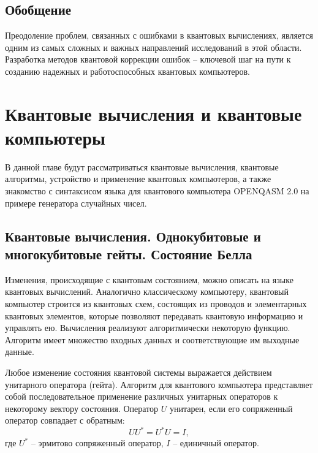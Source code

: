 \documentclass[12pt,a4paper]{article}
\begin{document}
\subsection{Обобщение}

Преодоление проблем, связанных с ошибками в квантовых вычислениях, является одним из самых сложных и важных направлений исследований в этой области. Разработка методов квантовой коррекции ошибок – ключевой шаг на пути к созданию надежных и работоспособных квантовых компьютеров.
	\section{Квантовые вычисления и квантовые компьютеры}
	
	В данной главе будут рассматриваться квантовые вычисления, квантовые алгоритмы, устройство и применение квантовых компьютеров, а также знакомство с синтаксисом языка для квантового компьютера OPENQASM 2.0 на примере генератора случайных чисел. 
	\subsection{Квантовые вычисления. Однокубитовые и многокубитовые гейты. Состояние Белла}
	
	Изменения, происходящие с квантовым состоянием, можно описать на языке квантовых вычислений. Аналогично классическому компьютеру, квантовый компьютер строится из квантовых схем, состоящих из проводов и элементарных квантовых элементов, которые позволяют передавать квантовую информацию и управлять ею. Вычисления реализуют алгоритмически некоторую функцию. Алгоритм имеет множество входных данных и соответствующие им выходные данные.
	
	Любое изменение состояния квантовой системы выражается действием унитарного оператора (гейта). Алгоритм для квантового компьютера представляет собой последовательное применение различных унитарных операторов к некоторому вектору состояния. Оператор $U$ унитарен, если его сопряженный оператор совпадает с обратным:
	\begin{equation}
		UU^{*} = U^{*}U = I,
	\end{equation}
	где $U^{*}$ -- эрмитово сопряженный оператор, $I$ -- единичный оператор. 
	
\end{document}
